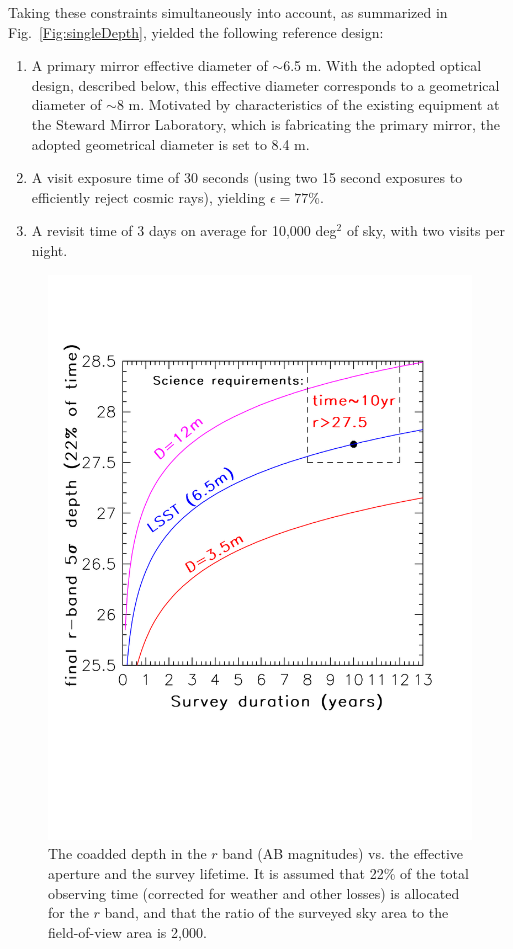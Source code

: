 \documentclass{emulateapj}
\begin{document}
Taking these constraints simultaneously into account, as summarized in 
Fig.~\ref{Fig:singleDepth}, 
yielded the following reference design:
\begin{enumerate}
\item A primary mirror effective diameter of $\sim$6.5 m. With the adopted optical 
design, described below, this effective diameter corresponds to a geometrical diameter 
of $\sim$8 m. Motivated by characteristics of the existing equipment at the
Steward Mirror Laboratory, which is fabricating the primary mirror, the adopted
geometrical diameter is set to 8.4 m. 
\item A visit exposure time of 30 seconds (using two 15 second exposures
to efficiently reject cosmic rays), yielding $\epsilon=77$\%.
\item A revisit time of 3 days on average for 10,000 deg$^2$ of sky, 
  with two visits per night.
\end{enumerate}

\begin{figure}[t]
\vskip -0.5in
\includegraphics[width=1.1\hsize,clip]{coaddedDepth.pdf}
\vskip -1.1in
\caption{The coadded depth in the $r$ band (AB magnitudes) vs. the effective aperture and 
the survey lifetime. It is assumed that 22\% of the total observing time (corrected for
weather and other losses) is allocated for the $r$ band, and that the ratio of 
the surveyed sky area to the field-of-view area is 2,000.} 
\label{Fig:coaddDepth}
\end{figure}
\end{document}
